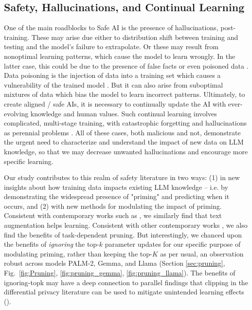 \documentclass[11pt, a4paper, logo, copyright]{googledeepmind}
\theoremstyle{plain}
\theoremstyle{definition}
\theoremstyle{remark}
\begin{document}
\subsection{Safety, Hallucinations, and Continual Learning}
One of the main roadblocks to Safe AI is the presence of hallucinations, post-training. These may arise due either to distribution shift between training \citep{nature_hallucinations} and testing and the model's failure to extrapolate. Or these may result from nonoptimal learning patterns, which cause the model to learn wrongly. In the latter case, this could be due to the presence of false facts \citep{bau1} or even poisoned data \citep{data2,data3}. Data poisoning is the injection of data into a training set which causes a vulnerability of the trained model \citep{mitigatepoison,poison2, poison3}. But it can also arise from suboptimal mixtures of data \citep{physics_LLMs, overshadow_hallucination, data1} which bias the model to learn incorrect patterns. Ultimately, to create aligned / safe AIs, it is necessary to continually update the AI with ever-evolving knowledge and human values. Such continual learning involves complicated, multi-stage training, with catastrophic forgetting and hallucinations as perennial problems \citep{continualLLM1,continualLLM2}. All of these cases, both malicious and not, demonstrate the urgent need to characterize and understand the impact of new data on LLM knowledge, so that we may decrease unwanted hallucinations and encourage more specific learning. 

Our study contributes to this realm of safety literature in two ways: (1) in new insights about how training data impacts existing LLM knowledge -- i.e. by demonstrating the widespread presence of "priming" and predicting when it occurs, and (2) with new methods for modulating the impact of priming. Consistent with contemporary works such as \citep{physics_LLMs, knowledge_injection}, we similarly find that text augmentation helps learning. Consistent with other contemporary works \citep{ties_merge}, we also find the benefits of task-dependent pruning. But interestingly, we chanced upon the benefits of \textit{ignoring} the top-$k$ parameter updates for our specific purpose of modulating priming, rather than keeping the top-$K$ as per usual, an observation robust across models PALM-2, Gemma, and Llama (Section \ref{sec:pruning}, Fig.~\ref{fig:Pruning}, \ref{fig:pruning_gemma}, \ref{fig:pruning_llama}). The benefits of ignoring-topk may have a deep connection to parallel findings that clipping in the differential privacy literature can be used to mitigate unintended learning effects (\cite{diff_privacy}).
\end{document}
